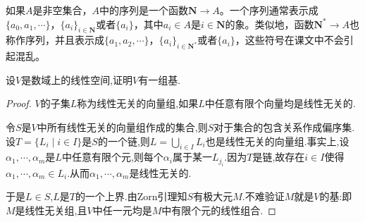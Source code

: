 \documentclass[../../main.tex]{subfiles}%
\begin{document}
\begin{remark}
如果$A$是非空集合，$A$中的序列是一个函数$\boldsymbol{N} \to A$。一个序列通常表示成$\{a_0, a_1, \cdots\}$，$\{a_i\}_{i \in \boldsymbol{N}}$或者$\{a_i\}$，其中$a_i \in A$是$i \in \boldsymbol{N}$的象。类似地，函数$\boldsymbol{N}^* \to A$也称作序列，并且表示成$\{a_1, a_2, \cdots\}$，$\{a_i\}_{i \in \boldsymbol{N}^*}$或者$\{a_i\}$，这些符号在课文中不会引起混乱。
\end{remark}

\begin{proposition}
设$V$是数域上的线性空间,证明$V$有一组基.
\end{proposition}
\begin{proof}

$V$的子集$L$称为线性无关的向量组,如果$L$中任意有限个向量均是线性无关的.

令$S$是$V$中所有线性无关的向量组作成的集合,则$S$对于集合的包含关系作成偏序集.设$T=\{L_i \mid i \in I\}$是$S$的一个链,则$L=\bigcup_{i \in I} L_i$也是线性无关的向量组.事实上,设$\alpha_1,\cdots,\alpha_m$是$L$中任意有限个元,则每个$\alpha_i$属于某一$L_{j_i}$.因为$T$是链,故存在$i \in I$使得$\alpha_1,\cdots,\alpha_m \in L_i$.从而$\alpha_1,\cdots,\alpha_m$是线性无关的.

于是$L \in S$,$L$是$T$的一个上界.由Zorn引理知$S$有极大元$M$.不难验证$M$就是$V$的基:即$M$是线性无关组,且$V$中任一元均是$M$中有限个元的线性组合.

\end{proof}
\end{document}
